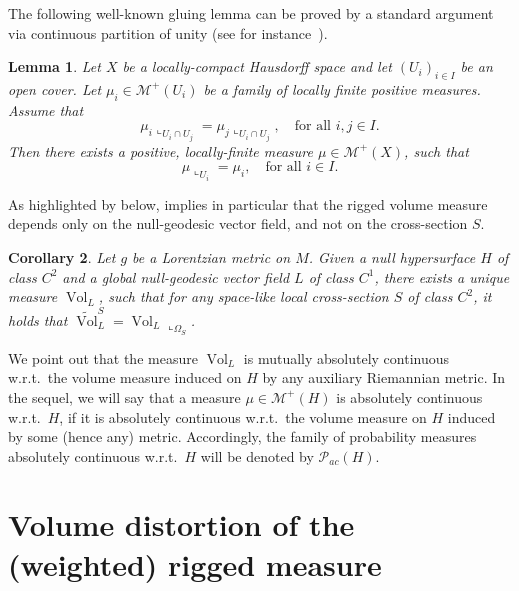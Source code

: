 \documentclass[12pt,a4paper]{amsart}
\theoremstyle{plain}
\newtheorem{lemma}{Lemma}[section]
\newtheorem{corollary}[lemma]{Corollary}
\theoremstyle{definition}
\numberwithin{equation}{section}
\DeclareMathOperator{\vol}{Vol}
\newcommand{\Prob}{\mathcal P}
\newcommand{\M}{\mathcal{M}}
\begin{document}
The following well-known gluing lemma can be proved by a standard argument via continuous partition of unity (see for instance~\cite[Th.~2.13]{Rudin}).
\begin{lemma}\label{L:gluing}
  Let $X$ be a locally-compact Hausdorff space and let $(U_i)_{i\in
    I}$ be an open cover.
  Let $\mu_i\in \M^{+}(U_i)$ be a family of locally finite positive
  measures.
  Assume that 
  $$\mu_i\llcorner_{U_i\cap U_j}=\mu_j\llcorner_{U_i\cap
    U_j}, \quad \text{for all $i,j\in I$.} $$ 
  Then there exists a positive, locally-finite measure
  $\mu\in\M^{+}(X)$, such that 
  $$\mu\llcorner_{U_i}=\mu_i ,\quad \text{for all $i\in I$}.$$
\end{lemma}

As highlighted by
 below,   implies in particular that the rigged volume
measure depends only on the null-geodesic vector field, and not on
the cross-section $S$.

\begin{corollary}
  \label{cor:rigged-volume}
  Let $g$ be a Lorentzian metric on $M$.
  Given a null hypersurface $H$ of class $C^2$ and a global null-geodesic vector
  field $L$ of class $C^1$, there exists a unique measure $\vol_L$, such that for any space-like local cross-section $S$ of class $C^2$, it holds that
  $\tilde{\vol}_L^S=\vol_L\llcorner_{\Omega_S}$.
\end{corollary}


We point out that the measure $\vol_L$ is mutually absolutely
continuous w.r.t.\ the volume measure induced on $H$ by any auxiliary Riemannian metric.
%
In the sequel, we will say that a measure $\mu\in\M^+(H)$ is
absolutely continuous w.r.t.\ $H$, if it is absolutely continuous
w.r.t.\ the volume measure on $H$ induced by some (hence any) metric.
%
Accordingly, the family of probability measures absolutely continuous w.r.t.\ $H$
will be denoted by $\Prob_{ac}(H)$.















\section{Volume distortion of the (weighted) rigged measure}\label{Sec:VolDist}
\end{document}
